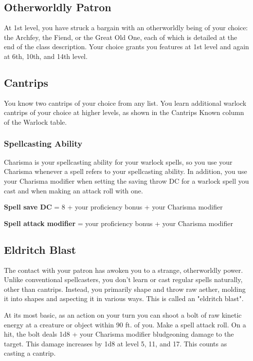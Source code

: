 \subsection{Otherworldly Patron}

At 1st level, you have struck a bargain with an otherworldly being of your choice: the Archfey, the Fiend, or the Great Old One, each of which is detailed at the end of the class description. Your choice grants you features at 1st level and again at 6th, 10th, and 14th level.

\subsection{Cantrips}

You know two cantrips of your choice from any list. You learn additional warlock cantrips of your choice at higher levels, as shown in the Cantrips Known column of the Warlock table.

\subsubsection{Spellcasting Ability}

Charisma is your spellcasting ability for your warlock spells, so you use your Charisma whenever a spell refers to your spellcasting ability. In addition, you use your Charisma modifier when setting the saving throw DC for a warlock spell you cast and when making an attack roll with one.

\textbf{Spell save DC} = 8 + your proficiency bonus + your Charisma modifier

\textbf{Spell attack modifier} = your proficiency bonus + your Charisma modifier

\subsection{Eldritch Blast}

The contact with your patron has awoken you to a strange, otherworldly power. Unlike conventional spellcasters, you don't learn or cast regular spells naturally, other than cantrips. Instead, you primarily shape and throw raw aether, molding it into shapes and aspecting it in various ways. This is called an "eldritch blast".

At its most basic, as an action on your turn you can shoot a bolt of raw kinetic energy at a creature or object within 90 ft. of you. Make a spell attack roll. On a hit, the bolt deals 1d8 + your Charisma modifier bludgeoning damage to the target. This damage increases by 1d8 at level 5, 11, and 17. This counts as casting a cantrip.


